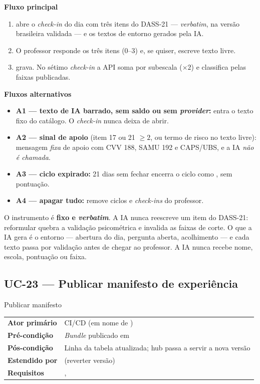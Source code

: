 \textbf{Fluxo principal}
\begin{enumerate}
  \item {} abre o \emph{check-in} do dia com três itens
    do DASS-21 --- \emph{verbatim}, na versão brasileira validada --- e os
    textos de entorno gerados pela IA.
  \item O professor responde os três itens (0--3) e, se quiser, escreve texto
    livre.
  \item {} grava. No sétimo
    \emph{check-in} a API soma por subescala ($\times 2$) e classifica pelas
    faixas publicadas.
\end{enumerate}

\textbf{Fluxos alternativos}
\begin{itemize}
  \item \textbf{A1 --- texto de IA barrado, sem saldo ou sem \emph{provider}:}
    entra o texto fixo do catálogo. O \emph{check-in} nunca deixa de abrir.
  \item \textbf{A2 --- sinal de apoio} (item 17 ou 21 $\geq 2$, ou termo de risco
    no texto livre): mensagem \emph{fixa} de apoio com CVV 188, SAMU 192 e
    CAPS/UBS, e a IA \emph{não é chamada}.
  \item \textbf{A3 --- ciclo expirado:} 21 dias sem fechar encerra o ciclo como
    , sem pontuação.
  \item \textbf{A4 --- apagar tudo:}  remove
    ciclos e \emph{check-ins} do professor.
\end{itemize}

\begin{regra}
O instrumento é \textbf{fixo e \emph{verbatim}}. A IA nunca reescreve um item do
DASS-21: reformular quebra a validação psicométrica e invalida as faixas de
corte. O que a IA gera é o entorno --- abertura do dia, pergunta aberta,
acolhimento --- e cada texto passa por validação antes de chegar ao professor. A
IA nunca recebe nome, escola, pontuação ou faixa.
\end{regra}

\subsection{UC-23 --- Publicar manifesto de experiência}

\begin{especificacao}{ Publicar manifesto}
\begin{tabularx}{\linewidth}{@{}L{28mm}X@{}}
\textbf{Ator primário} & CI/CD (em nome de )\\
\textbf{Pré-condição} & \emph{Bundle} publicado em
  \\
\textbf{Pós-condição} & Linha da tabela  atualizada; hub passa a
  servir a nova versão\\
\textbf{Estendido por} &  (reverter versão)\\
\textbf{Requisitos} & , \\
\end{tabularx}
\end{especificacao}

